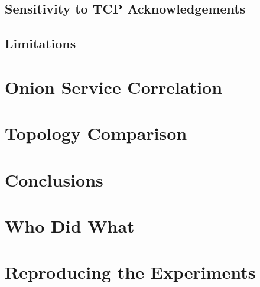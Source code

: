 \documentclass[10pt,a4paper]{article}
\numberwithin{figure}{section}
\numberwithin{table}{section}
\begin{document}
\subsection{Sensitivity to TCP Acknowledgements}
\label{sec:clearnet-acks}

\subsection{Limitations}
\label{sec:clearnet-limits}
\section{Onion Service Correlation}
\label{sec:onion}
\section{Topology Comparison}
\label{sec:topology}
\section{Conclusions}
\label{sec:conclusions}





\appendix
\section{Who Did What}
\label{app:who-did-what}
\section{Reproducing the Experiments}
\label{app:reproducibility}
\end{document}
